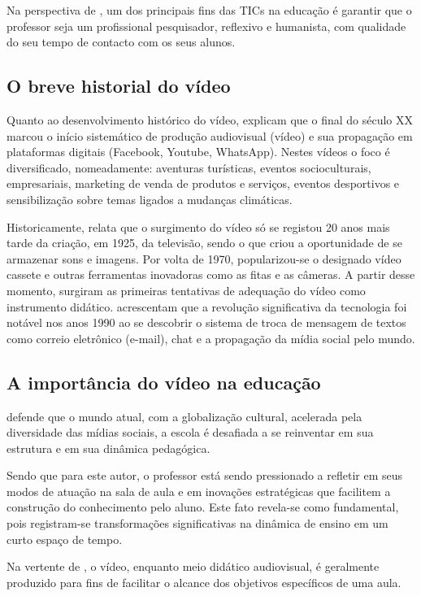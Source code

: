 \documentclass[portuguese]{textolivre}
\begin{document}
Na perspectiva de \textcite{silveira2020}, um dos principais fins das TICs na educação é garantir que o professor seja um profissional pesquisador, reflexivo e humanista, com qualidade do seu tempo de contacto com os seus alunos.

\subsection{O breve historial do vídeo}
Quanto ao desenvolvimento histórico do vídeo, \textcite{silveira2020} explicam que o final do século XX marcou o início sistemático de produção audiovisual (vídeo) e sua propagação em plataformas digitais (Facebook, Youtube, WhatsApp). Nestes vídeos o foco é diversificado, nomeadamente: aventuras turísticas, eventos socioculturais, empresariais, marketing de venda de produtos e serviços, eventos desportivos e sensibilização sobre temas ligados a mudanças climáticas.

Historicamente, \textcite{deckert2010} relata que o surgimento do vídeo só se registou 20 anos mais tarde da criação, em 1925, da televisão, sendo o que criou a oportunidade de se armazenar sons e imagens. Por volta de 1970, popularizou-se o designado vídeo cassete e outras ferramentas inovadoras como as fitas e as câmeras. A partir desse momento, surgiram as primeiras tentativas de adequação do vídeo como instrumento didático. \textcite{silveira2020} acrescentam que a revolução significativa da tecnologia foi notável nos anos 1990 ao se descobrir o sistema de troca de mensagem de textos como correio eletrônico (e-mail), chat e a propagação da mídia social pelo mundo.

\subsection{A importância do vídeo na educação}
\textcite{deckert2010} defende que o mundo atual, com a globalização cultural, acelerada pela diversidade das mídias sociais, a escola é desafiada a se reinventar em sua estrutura e em sua dinâmica pedagógica.

Sendo que para este autor, o professor está sendo pressionado a refletir em seus modos de atuação na sala de aula e em inovações estratégicas que facilitem a construção do conhecimento pelo aluno. Este fato revela-se como fundamental, pois registram-se transformações significativas na dinâmica de ensino em um curto espaço de tempo.

Na vertente de \textcite{spanhol2009}, o vídeo, enquanto meio didático audiovisual, é geralmente produzido para fins de facilitar o alcance dos objetivos específicos de uma aula.
\end{document}
